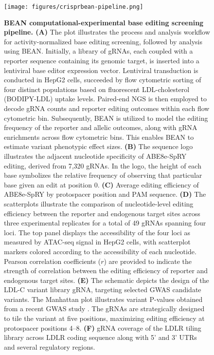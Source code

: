 \documentclass[a4paper, titlepage, openright]{book}
\begin{document}
%
\begin{figure}[!]
	\centering
	\texttt{[image: figures/crisprbean-pipeline.png]}
	\caption[BEAN computational-experimental base editing screening pipeline]{\textbf{BEAN computational-experimental base editing screening pipeline. (A)} The plot illustrates the process and analysis workflow for activity-normalized base editing screening, followed by analysis using BEAN. Initially, a library of gRNAs, each coupled with a reporter sequence containing its genomic target, is inserted into a lentiviral base editor expression vector. Lentiviral transduction is conducted in HepG2 cells, succeeded by flow cytometric sorting of four distinct populations based on fluorescent LDL-cholesterol (BODIPY-LDL) uptake levels. Paired-end NGS is then employed to decode gRNA counts and reporter editing outcomes within each flow cytometric bin. Subsequently, BEAN is utilized to model the editing frequency of the reporter and allelic outcomes, along with gRNA enrichments across flow cytometric bins. This enables BEAN to estimate variant phenotypic effect sizes. \textbf{(B)} The sequence logo illustrates the adjacent nucleotide specificity of ABE8e-SpRY editing, derived from 7,320 gRNAs. In the logo, the height of each base symbolizes the relative frequency of observing that particular base given an edit at position 0. \textbf{(C)} Average editing efficiency of ABE8e-SpRY by protospacer position and PAM sequence. \textbf{(D)} The scatterplots illustrate the comparison of nucleotide-level editing efficiency between the reporter and endogenous target sites across three experimental replicates for a total of 49 gRNAs spanning four loci. The top panel displays the accessibility of the four loci as measured by ATAC-seq signal in HepG2 cells, with scatterplot markers colored according to the accessibility of each nucleotide. Pearson correlation coefficients ($r$) are provided to indicate the strength of correlation between the editing efficiency of reporter and endogenous target sites. \textbf{(E)} The schematic depicts the design of the LDL-C variant library gRNA, targeting selected GWAS candidate variants. The Manhattan plot illustrates variant P-values obtained from a recent GWAS study \citep{klimentidis2020phenotypic}. The gRNAs are strategically designed to tile the variant at five positions, maximizing editing efficiency at protospacer positions 4–8. \textbf{(F)} gRNA coverage of the LDLR tiling library across LDLR coding sequence along with 5’ and 3’ UTRs and several regulatory regions.}
	\label{fig:bean-pipeline}
\end{figure}
\end{document}
